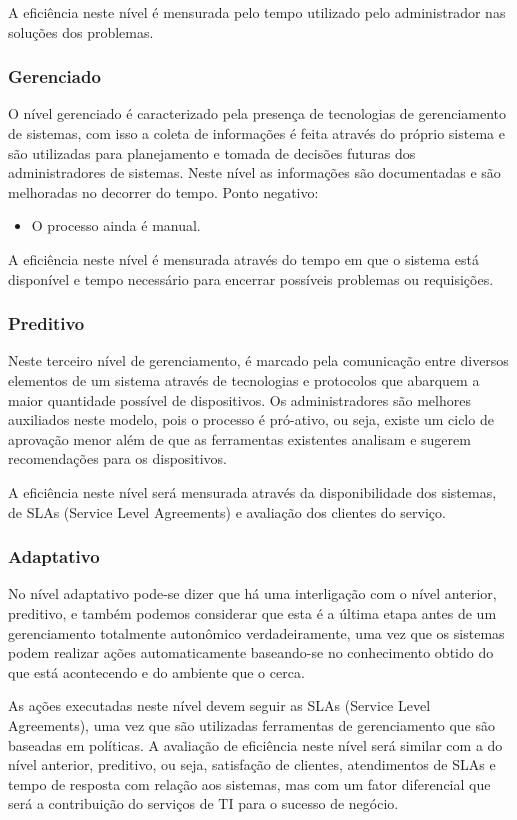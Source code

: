 \documentclass[11pt,twoside]{article}
\begin{document}
A eficiência neste nível é mensurada pelo tempo utilizado pelo administrador nas soluções dos problemas.

\subsubsection{Gerenciado}
O nível gerenciado é caracterizado pela presença de tecnologias de gerenciamento de sistemas, com isso a coleta de informações é feita através do próprio sistema e são utilizadas para planejamento e tomada de decisões futuras dos administradores de sistemas. Neste nível as informações são documentadas e são melhoradas no decorrer do tempo.
Ponto negativo:
\begin{itemize}
\item O processo ainda é manual.
\end{itemize}

A eficiência neste nível é mensurada através do tempo em que o sistema está disponível e tempo necessário para encerrar possíveis problemas ou requisições.

\subsubsection{Preditivo}
Neste terceiro nível de gerenciamento, é marcado pela comunicação entre diversos elementos de um sistema através de tecnologias e protocolos que abarquem a maior quantidade possível de dispositivos. Os administradores são melhores auxiliados neste modelo, pois o processo é pró-ativo, ou seja, existe um ciclo de aprovação menor além de que as ferramentas existentes analisam e sugerem recomendações para os dispositivos.

A eficiência neste nível será mensurada através da disponibilidade dos sistemas, de SLAs (Service Level Agreements) e avaliação dos clientes do serviço.

\subsubsection{Adaptativo}
No nível adaptativo pode-se dizer que há uma interligação com o nível anterior, preditivo, e também podemos considerar que esta é a última etapa antes de um gerenciamento totalmente autonômico verdadeiramente, uma vez que os sistemas podem realizar ações automaticamente baseando-se no conhecimento obtido do que está acontecendo e do ambiente que o cerca. 

As ações executadas neste nível devem seguir as SLAs (Service Level Agreements), uma vez que são utilizadas ferramentas de gerenciamento que são baseadas em políticas.
A avaliação de eficiência neste nível será similar com a do nível anterior, preditivo, ou seja, satisfação de clientes, atendimentos de SLAs e tempo de resposta com relação aos sistemas, mas com um fator diferencial que será a contribuição do serviços de TI para o sucesso de negócio.
\end{document}
